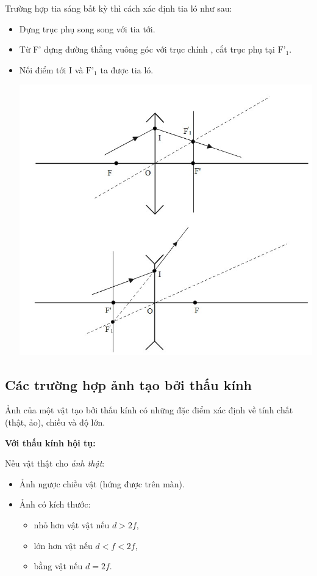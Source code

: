 Trường hợp tia sáng bất kỳ thì cách xác định tia ló như sau:
\begin{itemize}
	\item Dựng trục phụ song song với tia tới.
	\item Từ F' dựng đường thẳng vuông góc  với trục chính , cắt trục phụ tại $\text{F'}_1$.
	\item Nối điểm tới I và $\text{F'}_1$ ta được tia ló.
	\begin{center}
		\includegraphics[scale=0.7]{../figs/VN11-PH-38-L-026-2-h26.jpg}
	\end{center} 
\end{itemize}

\subsection{ Các trường hợp ảnh tạo bởi thấu kính}
Ảnh của một vật tạo bởi thấu kính có những đặc điểm xác định về tính chất (thật, ảo), chiều và độ lớn.

\textbf{Với thấu kính hội tụ:}

Nếu vật thật cho \textit{ảnh thật}:
\begin{itemize}
	\item Ảnh ngược chiều vật (hứng được trên màn).
	\item Ảnh có kích thước: 
\begin{itemize}
	\item nhỏ hơn vật vật nếu $d>2f$,
	\item lớn hơn vật nếu $d<f<2f$,
	\item bằng vật nếu $d=2f$.
\end{itemize}
\end{itemize}

